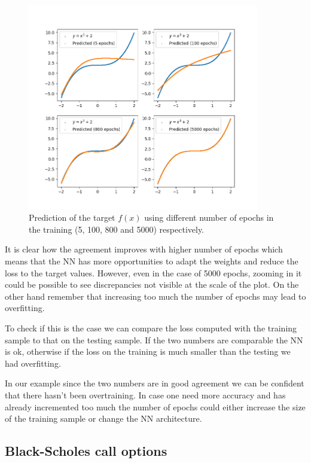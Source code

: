\begin{figure}[htb]
	\centering
	\includegraphics[width=0.9\textwidth]{figures/training_vs_epoch}
	\caption{Prediction of the target $f(x)$ using different number of epochs in the training (5, 100, 800 and 5000) respectively.}
	\label{fig:training_vs_epochs}
\end{figure}

It is clear how the agreement improves with higher number of epochs
which means that the NN has more opportunities to adapt the weights and
reduce the loss to the target values. However, even in the
case of 5000 epochs, zooming in it could be possible to see discrepancies not visible
at the scale of the plot. On the other hand remember that increasing too much the number
of epochs may lead to overfitting. 

To check if this is the case we can compare the loss computed with the training sample
to that on the testing sample. If the two numbers are comparable the NN is
ok, otherwise if the loss on the training is much smaller than the testing we
had overfitting.

In our example since the two numbers are in good agreement we can be confident that 
there hasn't been overtraining.
In case one need more accuracy and has already incremented too much the number of epochs
could either increase the size of the training sample or change the NN architecture.

\subsection{Black-Scholes call
options}\label{black-scholes-call-options}

